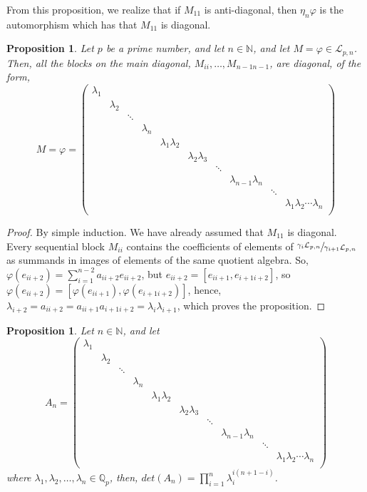 \documentclass[12pt]{article}
\newtheorem{proposition}[theorem]{Proposition}
\begin{document}
From this proposition, we realize that if $M_{11}$ is anti-diagonal, then $\eta_n\varphi$ is the automorphism which has that $M_{11}$ is diagonal.
\begin{proposition}
\label{prop.main.diagonal.blocks}
Let $p$ be a prime number, and let $n\in\mathbb{N}$, and let $M=\varphi\in\mathcal{L}_{p,n}$. Then, all the blocks on the main diagonal, $M_{ii},\dots,M_{n-1n-1}$, are diagonal, of the form,$$
M=\varphi=\begin{pmatrix}
\lambda_1 & & & & & & & &\\
& \lambda_2 & & & & & & &\\
& & \ddots & & & & & &\\
& & & \lambda_n & & & & &\\
& & & & \lambda_1\lambda_2 & & & &\\
& & & & & \lambda_2\lambda_3 & & &\\
& & & & & & \ddots & &\\
& & & & & & & \lambda_{n-1}\lambda_n & &\\
& & & & & & & & \ddots &\\
& & & & & & & & & \lambda_1\lambda_2\cdots\lambda_n\\
\end{pmatrix}
$$
\end{proposition}
\begin{proof}
By simple induction. We have already assumed that $M_{11}$ is diagonal. Every sequential block $M_{ii}$ contains the coefficients of elements of $\sfrac{\gamma_i\mathcal{L}_{p,n}}{\gamma_{i+1}\mathcal{L}_{p,n}}$ as summands in images of elements of the same quotient algebra. So, $\varphi(e_{ii+2})=\sum_{i=1}^{n-2}a_{ii+2}e_{ii+2}$, but $e_{ii+2}=[e_{ii+1},e_{i+1i+2}]$, so $\varphi(e_{ii+2})=[\varphi(e_{ii+1}),\varphi(e_{i+1i+2})]$, hence, $\lambda_{i+2}=a_{ii+2}=a_{ii+1}a_{i+1i+2}=\lambda_{i}\lambda_{i+1}$, which proves the proposition.
\end{proof}
\begin{proposition}
\label{prop.h.matrix.determinant}
Let $n\in\mathbb{N}$, and let $$
A_n=\begin{pmatrix}
\lambda_1 & & & & & & & &\\
& \lambda_2 & & & & & & &\\
& & \ddots & & & & & &\\
& & & \lambda_n & & & & &\\
& & & & \lambda_1\lambda_2 & & & &\\
& & & & & \lambda_2\lambda_3 & & &\\
& & & & & & \ddots & &\\
& & & & & & & \lambda_{n-1}\lambda_n & &\\
& & & & & & & & \ddots &\\
& & & & & & & & & \lambda_1\lambda_2\cdots\lambda_n\\
\end{pmatrix}
$$
where $\lambda_1,\lambda_2,\dots,\lambda_n\in\mathbb{Q}_p$, then, $det(A_n)=\prod_{i=1}^{n}\lambda_i^{i(n+1-i)}$.
\end{proposition}
\end{document}
